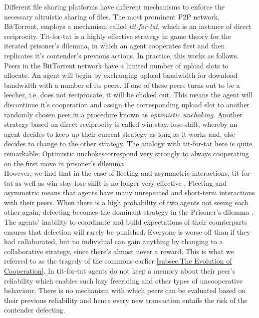 \documentclass[11pt,a4paper]{report}
\theoremstyle{definition}
\theoremstyle{theorem}
\theoremstyle{proposition}
\theoremstyle{corollary}
\theoremstyle{lemma}
\theoremstyle{example}
\theoremstyle{remark}
\begin{document}
\noindent{}Different file sharing platforms have different mechanisms to enforce the necessary altruistic sharing of files. The most prominent P2P network, BitTorrent, employs a mechanism called {\it tit-for-tat}, which is an instance of direct reciprocity. Tit-for-tat is a highly effective strategy in game theory for the iterated prisoner's dilemma, in which an agent cooperates first and then replicates it's contender's previous actions. In practice, this works as follows. Peers in the BitTorrent network have a limited number of upload slots to allocate. An agent will begin by exchanging upload bandwidth for download bandwidth with a number of its peers. If one of these peers turns out to be a leecher, i.e. does not reciprocate, it will be choked out. This means the agent will discontinue it's cooperation and assign the corresponding upload slot to another randomly chosen peer in a procedure known as {\it optimistic unchoking}. Another strategy based on direct reciprocity is called win-stay, lose-shift, whereby an agent decides to keep up their current strategy as long as it works and, else decides to change to the other strategy. The analogy with tit-for-tat here is quite remarkable; Optimistic unchokescorrespond very strongly to always cooperating on the first move in prisoner’s dilemma. \cite{Incentives build robustness in BitTorrent} \vspace{1em}\\

\noindent{}However, we find that in the case of fleeting and asymmetric interactions, tit-for-tat as well as win-stay-lose-shift is no longer very effective \cite{A Simple Rule for the Evolution of Cooperation on Graphs and Social Networks}. Fleeting and asymmetric means that agents have many unrepeated and short-term interactions with their peers. When there is a high probability of two agents not seeing each other again, defecting becomes the dominant strategy in the Prisoner's dilemma \cite{An optimal strategy to solve the prisoner's dilemma}. The agents' inability to coordinate and build expectations of their counterparts ensures that defection will rarely be punished. Everyone is worse off than if they had collaborated, but no individual can gain anything by changing to a collaborative strategy, since there's almost never a reward. This is what we referred to as the tragedy of the commons earlier \ref{subsec:The Evolution of Cooperation}. In tit-for-tat agents do not keep a memory about their peer’s reliability which enables such lazy freeriding and other types of uncooperative behaviour. There is no mechanism with which peers can be evaluated based on their previous reliability and hence every new transaction entails the risk of the contender defecting. \vspace{1em}\\
\end{document}
